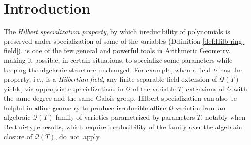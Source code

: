 \documentclass[11pt,a4paper,reqno]{amsart}
\theoremstyle{definition}
\begin{document}

\maketitle


\section{Introduction} \label{sec:intro}

The \emph{Hilbert specialization property}, by which irreducibility of polynomials is preserved under specialization of some of the variables (Definition \ref{def:Hilb-ring-field}), is one of the few general and powerful tools in Arithmetic Geometry, making it possible, in certain situations, to specialize some parameters while keeping the algebraic structure unchanged. 
For example, when a field ${\mathcal Q}$ has the property, \hbox{i.e.}, is a \emph{Hilbertian field}, any finite separable field extension of $\mathcal{Q}(T)$ yields, via appropriate specializations  in $\mathcal{Q}$ of the variable $T$, extensions of $\mathcal{Q}$ with the same degree and the same Galois group. Hilbert spe\-cialization can also be helpful in affine geometry to produce irreducible affine ${\mathcal Q}$-varieties
from an algebraic $\mathcal{Q}(T)$-family of varieties parametrized by parameters $T$, no\-tably when Bertini-type results, which require irreducibility of the family {over the algebraic closure of} ${\mathcal Q}(T)$, \hbox{do not apply.}
\vskip 1mm
\end{document}
